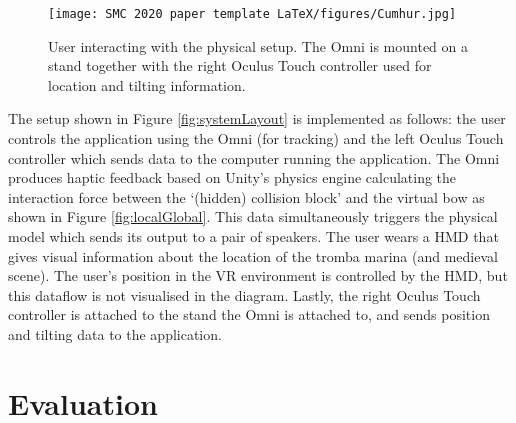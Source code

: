 \documentclass[dvipsnames, pdftex]{article}
\begin{document}

\begin{figure}[ht]\texttt{[image: SMC 2020 paper template LaTeX/figures/Cumhur.jpg]}
\centering
  \caption{User interacting with the physical setup. The Omni is mounted on a  stand together with the right Oculus Touch controller used for location and tilting information. \label{fig:physicalSetup}}
\end{figure}
The setup shown in Figure \ref{fig:systemLayout} is implemented as follows: the user controls the application using the Omni (for tracking) and the left Oculus Touch controller which sends data to the computer running the application. The Omni produces haptic feedback based on Unity's physics engine calculating the interaction force between  the `(hidden) collision block'  and the virtual bow as shown in Figure \ref{fig:localGlobal}. This data simultaneously triggers the physical model which sends its output to a pair of speakers. The user wears a HMD that gives visual information about the location of the tromba marina (and medieval scene). The user's position in the VR environment is controlled by the HMD, but this dataflow is not visualised in the diagram. Lastly, the right Oculus Touch controller is attached to the stand the Omni is attached to, and sends position and tilting data to the application.



\section{Evaluation}\label{sec:eval}
\end{document}
